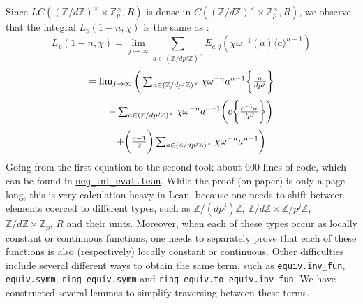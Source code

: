 \documentclass[a4paper,UKenglish,cleveref, autoref, thm-restate]{lipics-v2021}
\newcommand{\lean}[1]{\texttt{#1}\xspace} %
\begin{document}
Since $LC((\mathbb{Z}/d \mathbb{Z})^{\times} \times \mathbb{Z}_p^{\times}, R)$ is dense in $C((\mathbb{Z}/d \mathbb{Z})^{\times} \times \mathbb{Z}_p^{\times}, R)$, 
we observe that the integral $L_p (1 - n, \chi)$ is the same as :
$$ L_p (1 - n, \chi) = \lim_{j \to \infty} \sum_{a \in (\mathbb{Z}/ d p^j \mathbb{Z})^{\times}} E_{c, j} (\chi \omega^{-1} (a) \langle a \rangle ^{n - 1}) $$
\begin{equation}\label{eqn:3}
$$ = \lim_{j \to \infty} \bigg ( \sum_{a \in (\mathbb{Z}/ d p^j \mathbb{Z})^{\times}} \chi \omega^{-n} a^{n - 1} \bigg \{ \frac{a}{d p^j} \bigg \} $$
\end{equation}
\begin{equation}\label{eqn:4}
$$\qquad - \sum_{a \in (\mathbb{Z}/ d p^j \mathbb{Z})^{\times}} \chi \omega^{-n} a^{n - 1} \bigg ( c \bigg \{ \frac{c^{-1} a}{d p^j} \bigg \} \bigg ) $$
\end{equation}
\begin{equation}\label{eqn:5}
$$\qquad + \bigg ( \frac{c - 1}{2} \bigg ) \sum_{a \in (\mathbb{Z}/ d p^j \mathbb{Z})^{\times}} \chi \omega^{-n} a^{n - 1} \bigg ) $$
\end{equation}
Going from the first equation to the second took about 600 lines of code, which can be found in \href{https://github.com/laughinggas/p-adic-L-functions/blob/main/src/neg_int_eval.lean}{\lean{neg\_int\_eval.lean}}. While the proof (on paper) is only a page long, 
this is very calculation heavy in Lean, because one needs to shift between elements coerced to different types, such as $\mathbb{Z}/ (d p^j) \mathbb{Z}$, 
$\mathbb{Z}/ d \mathbb{Z} \times \mathbb{Z}/ p^j \mathbb{Z}$, $\mathbb{Z}/ d \mathbb{Z} \times \mathbb{Z}_p$, $R$ and their units. Moreover, when each of these types occur 
as locally constant or continuous functions, one needs to separately prove that each of these functions 
is also (respectively) locally constant or continuous. Other difficulties include several different ways to obtain the same term, such as \lean{equiv.inv\_fun}, 
\lean{equiv.symm}, \lean{ring\_equiv.symm} and \lean{ring\_equiv.to\_equiv.inv\_fun}. We have constructed several lemmas to simplify traversing between these terms. 
\end{document}
